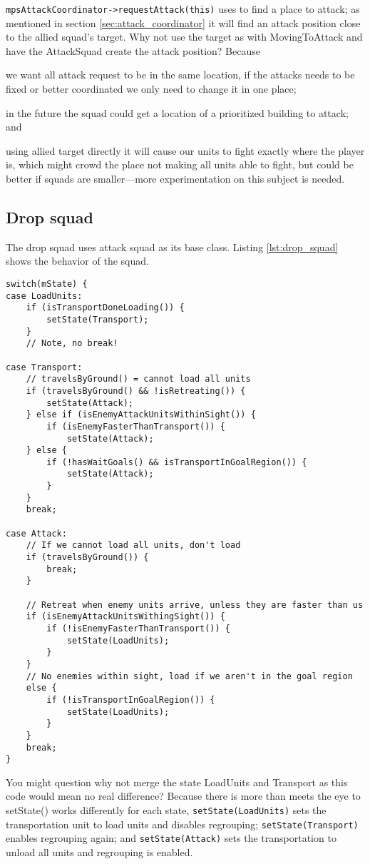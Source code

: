\texttt{mpsAttackCoordinator->requestAttack(this)} uses  to find a place to attack; as mentioned in section \ref{sec:attack_coordinator} it will find an attack position close to the allied squad's target. Why not use the target as with MovingToAttack and have the AttackSquad create the attack position? Because
\begin{inparaenum}[1\upshape)]
	\item we want all attack request to be in the same location, if the attacks needs to be fixed or better coordinated we only need to change it in one place;
	\item in the future the squad could get a location of a prioritized building to attack; and
	\item using allied target directly it will cause our units to fight exactly where the player is, which might crowd the place not making all units able to fight, but could be better if squads are smaller—more experimentation on this subject is needed.
\end{inparaenum}

\subsection{Drop squad}
\label{sec:drop_squad}
The drop squad uses attack squad as its base class. Listing \ref{lst:drop_squad} shows the behavior of the squad.
\begin{lstlisting}[caption={Drop squad behavior.},label={lst:drop_squad}]
switch(mState) {
case LoadUnits:
	if (isTransportDoneLoading()) {
		setState(Transport);
	}
	// Note, no break!

case Transport:
	// travelsByGround() = cannot load all units
	if (travelsByGround() && !isRetreating()) {
		setState(Attack);
	} else if (isEnemyAttackUnitsWithinSight()) {
		if (isEnemyFasterThanTransport()) {
			setState(Attack);
	} else {
		if (!hasWaitGoals() && isTransportInGoalRegion()) {
			setState(Attack);
		}
	}
	break;

case Attack:
	// If we cannot load all units, don't load
	if (travelsByGround()) {
		break;
	}

	// Retreat when enemy units arrive, unless they are faster than us
	if (isEnemyAttackUnitsWithingSight()) {
		if (!isEnemyFasterThanTransport()) {
			setState(LoadUnits);
		}
	}
	// No enemies within sight, load if we aren't in the goal region
	else {
		if (!isTransportInGoalRegion()) {
			setState(LoadUnits);
		}
	}
	break;
}
\end{lstlisting}
You might question why not merge the state LoadUnits and Transport as this code would mean no real difference? Because there is more than meets the eye to setState() works differently for each state, \texttt{setState(LoadUnits)} sets the transportation unit to load units and disables regrouping; \texttt{setState(Transport)} enables regrouping again; and \texttt{setState(Attack)} sets the transportation to unload all units and regrouping is enabled.

